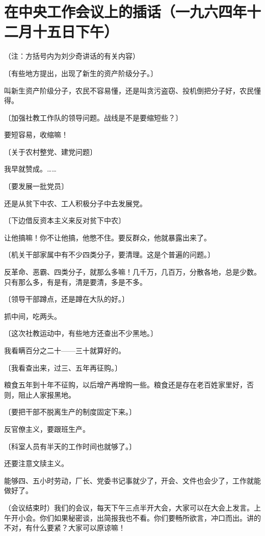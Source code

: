\section[在中央工作会议上的插话（一九六四年十二月十五日下午）]{在中央工作会议上的插话（一九六四年十二月十五日下午）}

（注：方括号内为刘少奇讲话的有关内容）

〔有些地方提出，出现了新生的资产阶级分子。〕

叫新生资产阶级分子，农民不容易懂，还是叫贪污盗窃、投机倒把分子好，农民懂得。

〔加强社教工作队的领导问题。战线是不是要缩短些？〕

要短容易，收缩嘛！

〔关于农村整党、建党问题〕

我早就赞成。……

〔要发展一批党员〕

还是从贫下中农、工人积极分子中去发展党。

〔下边借反资本主义来反对贫下中农〕

让他搞嘛！你不让他搞，他憋不住。要反群众，他就暴露出来了。

〔机关干部家属中有不少四类分子，要清理。这是个普遍的问题。〕

反革命、恶霸、四类分子，就那么多嘛！几千万，几百万，分散各地，总是少数。只有那么多，有是有，清是要清，多是不多。

〔领导干部蹲点，还是蹲在大队的好。〕

抓中间，吃两头。

〔这次社教运动中，有些地方还查出不少黑地。〕

我看瞒百分之二十——三十就算好的。

〔我看查出来，过三、五年再征购。〕

粮食五年到十年不征购，以后增产再增购一些。粮食还是存在老百姓家里好，否则，阻止人家报黑地。

〔要把干部不脱离生产的制度固定下来。〕

反官僚主义，要跟班生产。

〔科室人员有半天的工作时间也就够了。〕

还要注意文牍主义。

能够四、五小时劳动，厂长、党委书记事就少了，开会、文件也会少了，工作就能做好了。

（会议结束时）我们的会议，每天下午三点半开大会，大家可以在大会上发言。上午开小会。你们如果秘密谈，出简报我也不看。你们要畅所欲言，冲口而出。讲的不对，有什么要紧？大家可以原谅嘛！

